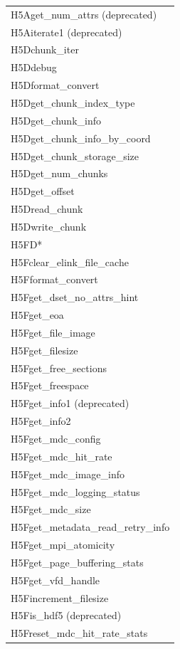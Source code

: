 \begin{longtable}{ |>{\raggedright\arraybackslash}p{\linewidth}| }
    \hline
    H5Aget\_num\_attrs (deprecated) \\
    H5Aiterate1 (deprecated) \\
    \hline
    H5Dchunk\_iter \\
    H5Ddebug \\
    H5Dformat\_convert \\
    H5Dget\_chunk\_index\_type \\
    H5Dget\_chunk\_info \\
    H5Dget\_chunk\_info\_by\_coord \\
    H5Dget\_chunk\_storage\_size \\
    H5Dget\_num\_chunks \\
    H5Dget\_offset \\
    H5Dread\_chunk \\
    H5Dwrite\_chunk \\
    \hline
    H5FD* \\
    \hline
    H5Fclear\_elink\_file\_cache \\
    H5Fformat\_convert \\
    H5Fget\_dset\_no\_attrs\_hint \\
    H5Fget\_eoa \\
    H5Fget\_file\_image \\
    H5Fget\_filesize \\
    H5Fget\_free\_sections \\
    H5Fget\_freespace \\
    H5Fget\_info1 (deprecated) \\
    H5Fget\_info2 \\
    H5Fget\_mdc\_config \\
    H5Fget\_mdc\_hit\_rate \\
    H5Fget\_mdc\_image\_info \\
    H5Fget\_mdc\_logging\_status \\
    H5Fget\_mdc\_size \\
    H5Fget\_metadata\_read\_retry\_info \\
    H5Fget\_mpi\_atomicity \\
    H5Fget\_page\_buffering\_stats \\
    H5Fget\_vfd\_handle \\
    H5Fincrement\_filesize \\
    H5Fis\_hdf5 (deprecated) \\
    H5Freset\_mdc\_hit\_rate\_stats \\

\end{longtable}
